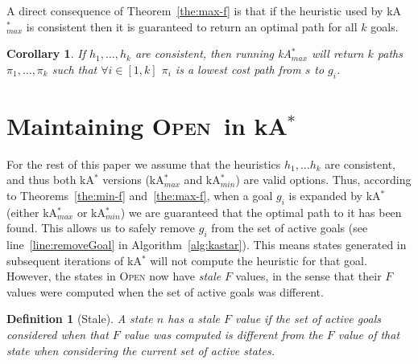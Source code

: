 \documentclass{aicom2e}
\newtheorem{definition}{Definition}
\newtheorem{corollary}{Corollary}
\newcommand{\kastar}{kA$^*$}
\newcommand{\kastarmin}{kA$^*_{min}$}
\newcommand{\kastarmax}{kA$^*_{max}$}
\newcommand{\open}{\textsc{Open}}
\newcommand{\roni}[1]{\textbf{[RS:#1]}}
\begin{document}
A direct consequence of Theorem~\ref{the:max-f} is that
if the heuristic used by \kastarmax{} is consistent then
it is guaranteed to return an optimal path for all $k$ goals.

\begin{corollary}%
If $h_1,\ldots,h_k$ are consistent, then running \kastarmax{} will return $k$ paths $\pi_1,\ldots, \pi_k$ such that $\forall i\in[1,k]$ $\pi_i$ is a lowest cost path from $s$ to $g_i$. \label{cor:max-f}
\end{corollary}


\section{Maintaining \open\ in \kastar{}} \label{sec:lazy}


For the rest of this paper we assume that the heuristics $h_1,\ldots h_k$ are consistent, and thus both \kastar{} versions  (\kastarmax{} and \kastarmin{}) are valid options. Thus, according to Theorems~\ref{the:min-f} and~\ref{the:max-f}, when a goal $g_i$ is
expanded by \kastar{} (either \kastarmax{} or \kastarmin{}) we are guaranteed that
the optimal path to it has been found. This allows us to safely remove $g_i$ from the
set of active goals (see line~\ref{line:removeGoal} in
Algorithm~\ref{alg:kastar}). This means states generated in subsequent iterations of \kastar{} 
will not compute the heuristic for that goal. However, the states in \open{} 
now have {\em stale} $F$ values, in the sense that their $F$ values 
were computed when the set of active goals was different. 
\begin{definition}[Stale]	
	A state $n$ has a stale $F$ value if the set of active goals considered when that $F$ value was computed 
	is different from the $F$ value of that state when considering the current set of active states. 
\end{definition}



\end{document}
